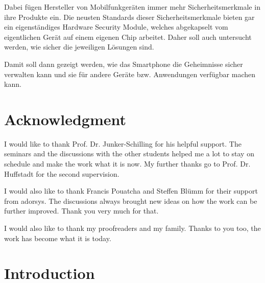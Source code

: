 \documentclass[12pt,oneside,a4paper,parskip]{scrbook}
\begin{document}
Dabei fügen Hersteller von Mobilfunkgeräten immer mehr Sicherheitsmerkmale in ihre Produkte ein. Die neusten Standards dieser Sicherheitsmerkmale bieten gar ein eigenständiges Hardware Security Module, welches abgekapselt vom eigentlichen Gerät auf einem eigenen Chip arbeitet. Daher soll auch untersucht werden, wie sicher die jeweiligen Lösungen sind.

Damit soll dann gezeigt werden, wie das Smartphone die Geheimnisse sicher verwalten kann und sie für andere Geräte bzw. Anwendungen verfügbar machen kann.

\newpage
\chapter*{Acknowledgment}

I would like to thank Prof. Dr. Junker-Schilling for his helpful support. The seminars and the discussions with the other students helped me a lot to stay on schedule and make the work what it is now. My further thanks go to Prof. Dr. Huffstadt for the second supervision. 

I would also like to thank Francis Pouatcha and Steffen Blümm for their support from adorsys. The discussions always brought new ideas on how the work can be further improved. Thank you very much for that.

I would also like to thank my proofreaders and my family. Thanks to you too, the work has become what it is today.

\tableofcontents



\mainmatter

\chapter{Introduction}\label{ch:intro}
\end{document}

